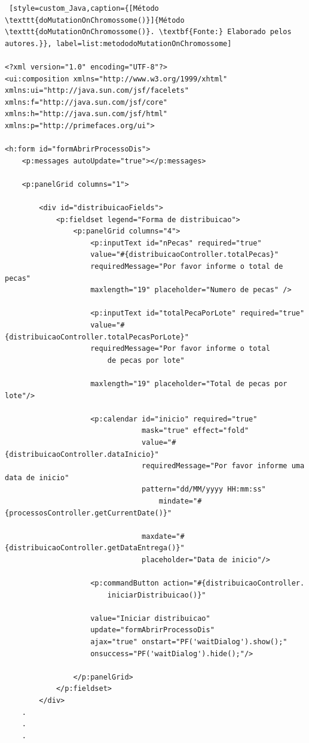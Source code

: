 \begin{lstlisting} [style=custom_Java,caption={[Método \texttt{doMutationOnChromossome()}]{Método \texttt{doMutationOnChromossome()}. \textbf{Fonte:} Elaborado pelos autores.}}, label=list:metododoMutationOnChromossome] 

<?xml version="1.0" encoding="UTF-8"?>
<ui:composition xmlns="http://www.w3.org/1999/xhtml"
xmlns:ui="http://java.sun.com/jsf/facelets"
xmlns:f="http://java.sun.com/jsf/core"
xmlns:h="http://java.sun.com/jsf/html"
xmlns:p="http://primefaces.org/ui">

<h:form id="formAbrirProcessoDis">
	<p:messages autoUpdate="true"></p:messages>
	
	<p:panelGrid columns="1">
	
		<div id="distribuicaoFields">
			<p:fieldset legend="Forma de distribuicao">
				<p:panelGrid columns="4">
					<p:inputText id="nPecas" required="true" 
					value="#{distribuicaoController.totalPecas}"
					requiredMessage="Por favor informe o total de pecas" 
					maxlength="19" placeholder="Numero de pecas" />
					
					<p:inputText id="totalPecaPorLote" required="true"
					value="#{distribuicaoController.totalPecasPorLote}"
					requiredMessage="Por favor informe o total 
						de pecas por lote"
						
					maxlength="19" placeholder="Total de pecas por lote"/>
					
					<p:calendar id="inicio" required="true"
								mask="true" effect="fold"
								value="#{distribuicaoController.dataInicio}"
								requiredMessage="Por favor informe uma data de inicio" 
								pattern="dd/MM/yyyy HH:mm:ss" 
									mindate="#{processosController.getCurrentDate()}"
					
								maxdate="#{distribuicaoController.getDataEntrega()}"
								placeholder="Data de inicio"/>
					
					<p:commandButton action="#{distribuicaoController.
						iniciarDistribuicao()}"
					
					value="Iniciar distribuicao" 
					update="formAbrirProcessoDis"
					ajax="true" onstart="PF('waitDialog').show();"
					onsuccess="PF('waitDialog').hide();"/>
				
				</p:panelGrid>
			</p:fieldset>
		</div>
	.
	.
	.

\end{lstlisting}

